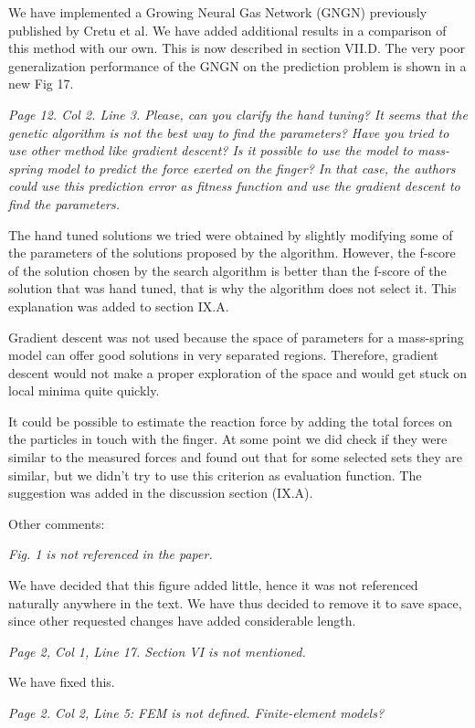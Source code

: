 \documentclass[letterpaper,12pt]{letter}
\begin{document}
We have implemented a Growing Neural Gas Network (GNGN) previously published by Cretu et al. We have added additional results in a comparison of this method with our own. This is now described in section VII.D. The very poor generalization performance of the GNGN on the prediction problem is shown in a new Fig 17.

\emph{Page 12. Col 2. Line 3. Please, can you clarify the hand tuning? It seems that the genetic algorithm is not the best way to find the parameters? Have you tried to use other method like gradient descent? Is it possible to use the model to mass-spring model to predict the force exerted on the finger? In that case, the authors could use this prediction error as fitness function and use the gradient descent to find the parameters.}

The hand tuned solutions we tried were obtained by slightly modifying some of the parameters of the solutions proposed by the algorithm.  However, the f-score of the solution chosen by the search algorithm is better than the f-score of the solution that was hand tuned, that is why the algorithm does not select it. This explanation was added to section IX.A.

Gradient descent was not used because the space of parameters for a mass-spring model can offer good solutions in very separated regions.  Therefore, gradient descent would not make a proper exploration of the space and would get stuck on local minima quite quickly.

It could be possible to estimate the reaction force by adding the total forces on the particles in touch with the finger.  At some point we did check if they were similar to the measured forces and found out that for some selected sets they are similar, but we didn’t try to use this criterion as evaluation function.  The suggestion was added in the discussion section (IX.A).

Other comments:

\emph{Fig. 1 is not referenced in the paper.}

We have decided that this figure added little, hence it was not referenced naturally anywhere in the text. We have thus decided to remove it to save space, since other requested changes have added considerable length. 

\emph{Page 2, Col 1, Line 17. Section VI is not mentioned.}

We have fixed this.

\emph{Page 2. Col 2, Line 5: FEM is not defined. Finite-element models?}
\end{document}
